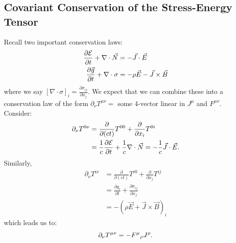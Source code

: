 \documentclass[../Main.tex]{subfiles}
\begin{document}
\subsection{Covariant Conservation of the Stress-Energy Tensor}
Recall two important conservation laws:
\begin{align*}
    \frac{\partial \mathcal{E}}{\partial t} + \nabla \cdot \vec{N}&= -\vec{J} \cdot \vec{E} \\
    \frac{\partial \vec{g}}{\partial t} + \nabla \cdot \sigma &= -\rho \vec{E} - \vec{J} \times \vec{B}
\end{align*}
where we say $[\nabla \cdot \sigma]_i = \frac{\partial \sigma_{ij}}{\partial x_j}$. We expect that we can combine these into a conservation law of the form $\partial_\nu T^{\mu\nu} = $ some 4-vector linear in $J^\mu$ and $F^{\mu\nu}$. Consider:
\begin{align*}
    \partial_\nu T^{0\nu} &= \frac{\partial }{\partial (ct)} T^{00} + \frac{\partial}{\partial x_i} T^{0i} \\
    &= \frac1c \frac{\partial \mathcal{E}}{\partial t} + \frac1c \nabla \cdot \vec{N} = -\frac1c \vec{J} \cdot \vec{E}.
\end{align*}
Similarly,
\begin{align*}
    \partial_\nu T^{i\nu} &= \frac{\partial}{\partial (ct)} T^{i0} + \frac{\partial }{\partial x_j}T^{ij} \\
    &= \frac{\partial g_i}{\partial t} + \frac{\partial \sigma_{ij}}{\partial x_j} \\
    &= -\left(\rho \vec{E} + \vec{J} \times \vec{B}\right)_i
\end{align*}
which leads us to:
\begin{equation}
    \partial_\nu T^{\mu\nu} = - \indx{F}\mu\rho J^\rho.
    \label{eqnSETensConverv}
\end{equation}
\end{document}
